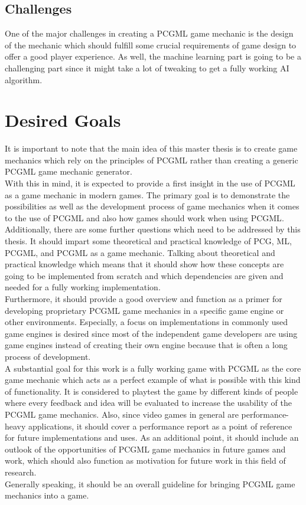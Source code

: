 \documentclass[MGS,Master,english]{twbook}%
\begin{document}
\subsection{Challenges}
One of the major challenges in creating a PCGML game mechanic is the design of the mechanic which should fulfill some crucial requirements of game design to offer a good player experience. As well, the machine learning part is going to be a challenging part since it might take a lot of tweaking to get a fully working AI algorithm.

\section{Desired Goals}
It is important to note that the main idea of this master thesis is to create game mechanics which rely on the principles of PCGML rather than creating a generic PCGML game mechanic generator.\\
With this in mind, it is expected to provide a first insight in the use of \ac{PCGML} as a game mechanic in modern games. The primary goal is to demonstrate the possibilities as well as the development process of game mechanics when it comes to the use of \ac{PCGML} and also how games should work when using \ac{PCGML}.\\
Additionally, there are some further questions which need to be addressed by this thesis. It should impart some theoretical and practical knowledge of PCG, ML, \ac{PCGML}, and \ac{PCGML} as a game mechanic. Talking about theoretical and practical knowledge which means that it should show how these concepts are going to be implemented from scratch and which dependencies are given and needed for a fully working implementation. \\
Furthermore, it should provide a good overview and function as a primer for developing proprietary \ac{PCGML} game mechanics in a specific game engine or other environments. Especially, a focus on implementations in commonly used game engines is desired since most of the independent game developers are using game engines instead of creating their own engine because that is often a long process of development. \\
A substantial goal for this work is a fully working game with \ac{PCGML} as the core game mechanic which acts as a perfect example of what is possible with this kind of functionality. It is considered to playtest the game by different kinds of people where every feedback and idea will be evaluated to increase the usability of the \ac{PCGML} game mechanics. Also, since video games in general are performance-heavy applications, it should cover a performance report as a point of reference for future implementations and uses. As an additional point, it should include an outlook of the opportunities of \ac{PCGML} game mechanics in future games and work, which should also function as motivation for future work in this field of research.\\
Generally speaking, it should be an overall guideline for bringing \ac{PCGML} game mechanics into a game.
\end{document}
